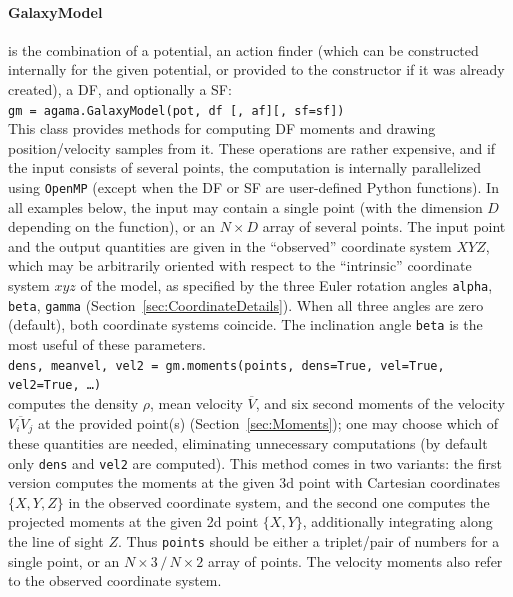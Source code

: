 \documentclass[12pt]{article}
\begin{document}
\paragraph{GalaxyModel} is the combination of a potential, an action finder (which can be constructed internally for the given potential, or provided to the constructor if it was already created), a DF, and optionally a SF:\\
\texttt{gm = agama.GalaxyModel(pot, df [, af][, sf=sf])}\\[2mm]
This class provides methods for computing DF moments and drawing position/velocity samples from it. These operations are rather expensive, and if the input consists of several points, the computation is internally parallelized using \texttt{OpenMP} (except when the DF or SF are user-defined Python functions). In all examples below, the input may contain a single point (with the dimension $D$ depending on the function), or an $N\times D$ array of several points. The input point and the output quantities are given in the ``observed'' coordinate system $XYZ$, which may be arbitrarily oriented with respect to the ``intrinsic'' coordinate system $xyz$ of the model, as specified by the three Euler rotation angles \texttt{alpha}, \texttt{beta}, \texttt{gamma} (Section~\ref{sec:CoordinateDetails}). When all three angles are zero (default), both coordinate systems coincide. The inclination angle \texttt{beta} is the most useful of these parameters.
\\[2mm]
\texttt{dens, meanvel, vel2 = gm.moments(points, dens=True, vel=True, vel2=True, \dots)}\\
computes the density $\rho$, mean velocity $\overline V$, and six second moments of the velocity $\overline{V_i V_j}$ at the provided point(s) (Section~\ref{sec:Moments}); one may choose which of these quantities are needed, eliminating unnecessary computations (by default only \texttt{dens} and \texttt{vel2} are computed). This method comes in two variants: the first version computes the moments at the given 3d point with Cartesian coordinates $\{X,Y,Z\}$ in the observed coordinate system, and the second one computes the projected moments at the given 2d point $\{X,Y\}$, additionally integrating along the line of sight $Z$. Thus \texttt{points} should be either a triplet/pair of numbers for a single point, or an $N\times3\,/\,N\times2$ array of points. The velocity moments also refer to the observed coordinate system.
\end{document}
